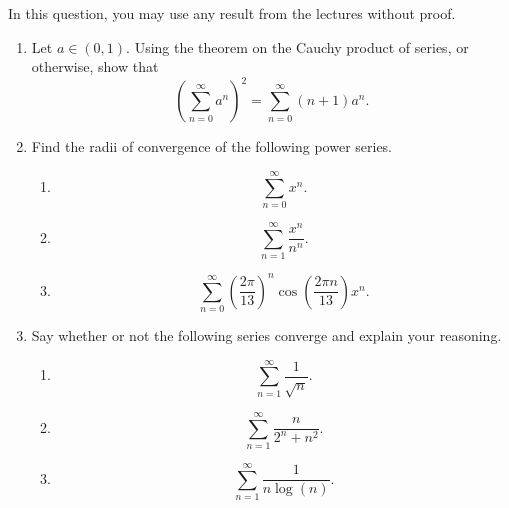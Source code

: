 \documentclass[
  12pt,
  a4paper]{extarticle}
\providecommand{\tightlist}{%
  \setlength{\itemsep}{0pt}\setlength{\parskip}{0pt}}
\theoremstyle{plain}
\theoremstyle{definition}
\theoremstyle{plain}
\theoremstyle{plain}
\theoremstyle{plain}
\theoremstyle{plain}
\theoremstyle{definition}
\theoremstyle{definition}
\newtheorem*{Order Axioms*}{Order Axioms}\newtheorem{Order Axioms}{Order Axioms}[section]
\theoremstyle{remark}
\theoremstyle{remark}
\let\BeginKnitrBlock\begin \let\EndKnitrBlock\end
\renewcommand{\;}{\,}
\begin{document}
\BeginKnitrBlock{example}
{\label{exm:ex4} }In this question, you may use any result from the lectures without proof.

\begin{enumerate}
\def\labelenumi{\alph{enumi})}
\tightlist
\item
  Let \(a \in (0,1)\). Using the theorem on the Cauchy product of series, or otherwise, show that \[\left(\sum_{n=0}^{\infty} a^n\right)^2 = \sum_{n=0}^{\infty} (n+1)a^n.\]
\item
  Find the radii of convergence of the following power series.

  \begin{enumerate}
  \def\labelenumii{\roman{enumii})}
  \tightlist
  \item
    \[\sum_{n=0}^{\infty}x^n.\]
  \item
    \[\sum_{n=1}^{\infty}\frac{x^n}{n^n}.\]
  \item
    \[\sum_{n=0}^{\infty}\left(\frac{2\pi}{13}\right)^n\cos\left(\frac{2\pi n}{13}\right)x^n.\]
  \end{enumerate}
\item
  Say whether or not the following series converge and explain your reasoning.

  \begin{enumerate}
  \def\labelenumii{\roman{enumii})}
  \tightlist
  \item
    \[\sum_{n=1}^{\infty}\frac{1}{\sqrt{n}}.\]
  \item
    \[\sum_{n=1}^{\infty}\frac{n}{2^n + n^2}.\]
  \item
    \[\sum_{n=1}^{\infty}\frac{1}{n\log(n)}.\]
  \end{enumerate}
\end{enumerate}
\EndKnitrBlock{example}
\end{document}
